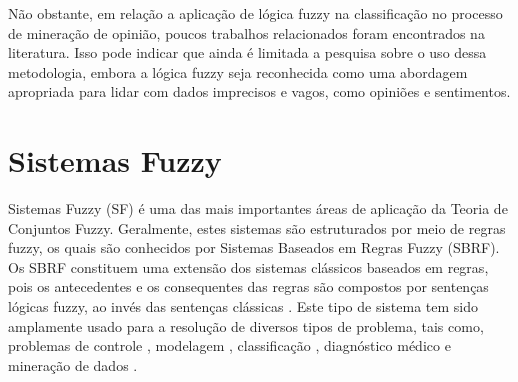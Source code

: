 \documentclass[template.tex]{subfiles}
\begin{document}

Não obstante, em relação a aplicação de lógica fuzzy na classificação no processo de mineração de opinião, poucos trabalhos relacionados foram encontrados na literatura. Isso pode indicar que ainda é limitada a pesquisa sobre o uso dessa metodologia, embora a lógica fuzzy seja reconhecida como uma abordagem apropriada para lidar com dados imprecisos e vagos, como opiniões e sentimentos.

\section{Sistemas Fuzzy}
\label{secao-sistemas-fuzzy}

Sistemas Fuzzy (SF) é uma das mais importantes áreas de aplicação da Teoria de Conjuntos Fuzzy. Geralmente, estes sistemas são estruturados por meio de regras fuzzy, os quais são conhecidos por Sistemas Baseados em Regras Fuzzy (SBRF). Os SBRF constituem uma extensão dos sistemas clássicos baseados em regras, pois os antecedentes e os consequentes das regras são compostos por sentenças lógicas fuzzy, ao invés das sentenças clássicas \cite{herrera2008genetic}. Este tipo de sistema tem sido amplamente usado para a resolução de diversos tipos de problema, tais como, problemas de controle \cite{mamdani1974application, mamdani1975experiment}, modelagem \cite{pedrycz1996fuzzy}, classificação \cite{ishibuchi1994construction, ishibuchi1995selecting}, diagnóstico médico \cite{sivasankar2010knowledge} e mineração de dados \cite{ishibuchi2005classification}.
\end{document}

